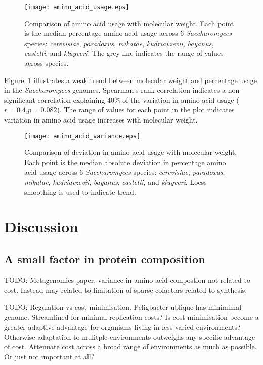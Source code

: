 \begin{figure}
  \centering
  \texttt{[image: amino\_acid\_usage.eps]}
  \caption[Comparison of amino acid usage with molecular weight]{Comparison of amino acid usage with molecular weight. Each point is the median percentage amino acid usage across 6 \emph{Saccharomyces} species: \emph{cerevisiae}, \emph{paradoxus}, \emph{mikatae}, \emph{kudriavzevii}, \emph{bayanus}, \emph{castelli}, and \emph{kluyveri}. The grey line indicates the range of values across species.}
  \label{figure:amino_acid_usage}
\end{figure}

Figure~\ref{figure:amino_acid_usage} illustrates a weak trend between molecular weight and percentage usage in the \emph{Saccharomyces} genomes. Spearman's rank correlation indicates a non-significant correlation explaining 40\% of the variation in amino acid usage ($r = 0.4$,$p = 0.082$). The range of values for each point in the plot indicates variation in amino acid usage increases with molecular weight.

\begin{figure}
  \centering
  \texttt{[image: amino\_acid\_variance.eps]}
  \caption[Comparison of deviation in amino acid usage with molecular weight]{Comparison of deviation in amino acid usage with molecular weight. Each point is the median absolute deviation in percentage amino acid usage across 6 \emph{Saccharomyces} species: \emph{cerevisiae}, \emph{paradoxus}, \emph{mikatae}, \emph{kudriavzevii}, \emph{bayanus}, \emph{castelli}, and \emph{kluyveri}. Loess smoothing is used to indicate trend.}
  \label{figure:amino_acid_variance}
\end{figure}
\clearpage

\section{Discussion}

\subsection{A small factor in protein composition}

TODO: Metagenomics paper, variance in amino acid compostion not related to cost. Instead may related to limitation of sparse cofactors related to synthesis.

TODO: Regulation vs cost minimisation. Peligbacter ublique has minimimal genome. Streamlined for minimal replication costs? Is cost minimisation become a greater adaptive advantage for organisms living in less varied environments? Otherwise adaptation to mulitple environments outweighs any specific advantage of cost. Attenuate cost across a broad range of environments as much as possible. Or just not important at all?

